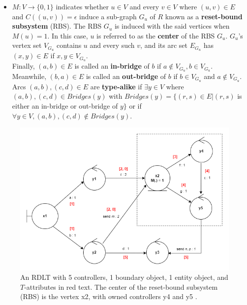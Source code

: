 \begin{definition}
\begin{itemize}
                \item $M : V \rightarrow \{0,1\}$ indicates whether $u \in V$ and every $v \in V$ where $(u,v) \in E$ and $C((u,v)) = \epsilon$ induce a sub-graph $G_{u}$ of $R$ known as a \textbf{reset-bound subsystem} (RBS). The RBS $G_{u}$ is induced with the said vertices when $M(u) = 1$. In this case, $u$ is referred to as the \textbf{center} of the RBS $G_{u}$. $G_{u}$'s vertex set $V_{G_{u}}$ contains $u$ and every such $v$, and its arc set $E_{G_{u}}$ has $(x,y) \in E$ if $x,y \in V_{G_{u}}$. \\
                
                Finally, $(a,b) \in E$ is called an \textbf{in-bridge} of $b$ if $a \notin V_{G_{u}}, b \in V_{G_{u}}$. Meanwhile, $(b,a) \in E$ is called an \textbf{out-bridge} of $b$ if $b \in V_{G_{u}}$ and $a \notin V_{G_{u}}$. Arcs $(a,b), (c,d) \in E$ are \textbf{type-alike} if $\exists y \in V$ where $(a,b), (c,d) \in Bridges(y)$ with $Bridges(y) = \{(r,s) \in E|(r,s)$ is either an in-bridge or out-bridge of $y\}$ or if $\forall y \in V, (a,b), (c,d) \notin Bridges(y)$.
                
            \end{itemize}
            
        \end{definition}

        \begin{figure}[h]
            \centering
            \includegraphics[scale=0.65]{figures/RDLT1.png}
            \caption{An RDLT with 5 controllers, 1 boundary object, 1 entity object, and $T$-attributes in red text. The center of the reset-bound subsystem (RBS) is the vertex x2, with owned controllers y4 and y5 \cite{yiu}.}
            \label{rdlt1}
        \end{figure} \par

